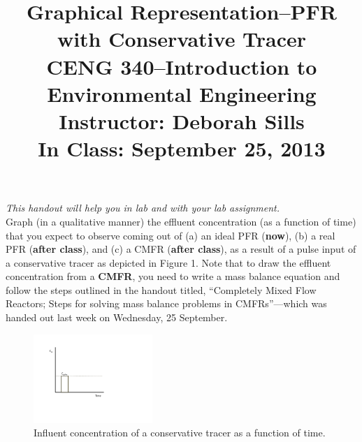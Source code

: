 \documentclass[11pt,letterpaper]{article}
\begin{document}
\setlength{\parindent}{0cm} 



\frenchspacing

\setlength{\textwidth}{6.25in}

\title {\Large{\textbf{Graphical Representation--PFR with Conservative Tracer}}\\ \large{CENG 340--Introduction to Environmental Engineering\\
Instructor: Deborah Sills\\ \textbf{In Class: September 25, 2013}}}

\author {}
\date {}
\maketitle

\vspace{-1.5cm}
\emph{This handout will help you in lab and with your lab assignment.}\\

Graph (in a qualitative manner) the effluent concentration (as a function of time) that you expect to observe coming out of (a) an ideal PFR (\textbf{now}), (b) a real PFR (\textbf{after class}), and (c) a CMFR (\textbf{after class}), as a result of a pulse input of a conservative tracer as depicted in Figure 1.  Note that to draw the effluent concentration from a \textbf{CMFR}, you need to write a mass balance equation and follow the steps outlined in the handout titled, ``Completely Mixed Flow Reactors; Steps for solving mass balance problems in CMFRs''---which was handed out last week on Wednesday, 25 September.

\begin{figure}
\centering
\includegraphics[width=0.4\textwidth]{C_in}
\caption{Influent concentration of a conservative tracer as a function of time.}
\end{figure}
\end{document}
